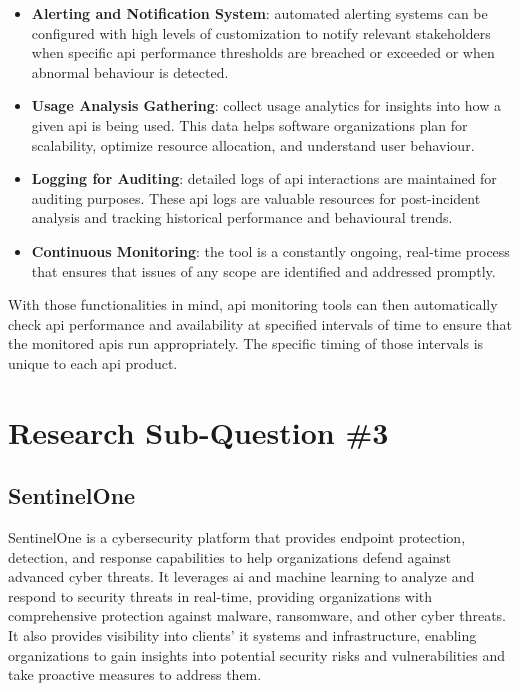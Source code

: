 \begin{multicols}{2}
\begin{itemize}
            \item \textbf{Alerting and Notification System}: automated alerting systems can be configured with high levels of 
                  customization to notify relevant stakeholders when specific \acrshort{api} performance thresholds are breached 
                  or exceeded or when abnormal behaviour is detected.
            \item \textbf{Usage Analysis Gathering}: collect usage analytics for insights into how a given \acrshort{api} is 
                  being used. This data helps software organizations plan for scalability, optimize resource allocation, and
                  understand user behaviour.
            \item \textbf{Logging for Auditing}: detailed logs of \acrshort{api} interactions are maintained for auditing 
                  purposes. These \acrshort{api} logs are valuable resources for post-incident analysis and tracking historical
                  performance and behavioural trends.
            \item \textbf{Continuous Monitoring}: the tool is a constantly ongoing, real-time process that ensures that 
                  issues of any scope are identified and addressed promptly.                  
      \end{itemize}
      With those functionalities in mind, \acrshort{api} monitoring tools can then automatically check \acrshort{api}
      performance and availability at specified intervals of time to ensure that the monitored \acrshort{api}s run
      appropriately. The specific timing of those intervals is unique to each \acrshort{api} product.
      \section{Research Sub-Question \#3}
      \subsection{SentinelOne} %
      SentinelOne is a cybersecurity platform that provides endpoint protection, detection, and response capabilities to 
      help organizations defend against advanced cyber threats. It leverages \acrlong{ai} and machine learning to analyze 
      and respond to security threats in real-time, providing organizations with comprehensive protection against malware,
      ransomware, and other cyber threats. It also provides visibility into clients' \acrshort{it} systems and infrastructure,
      enabling organizations to gain insights into potential security risks and vulnerabilities and take proactive measures 
      to address them.

\end{multicols}
